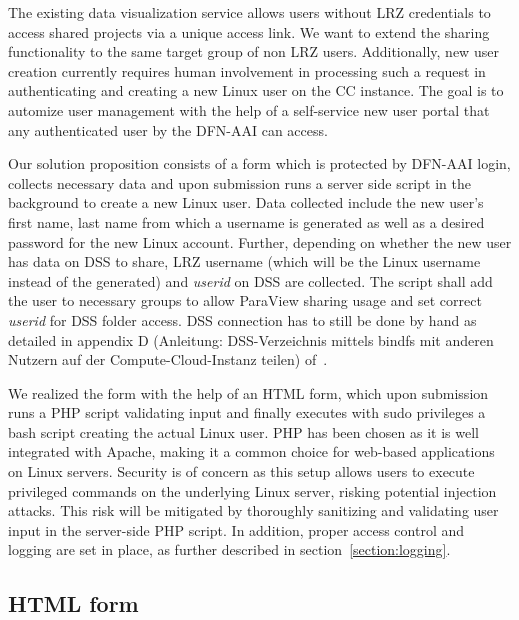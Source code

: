 The existing data visualization service allows users without LRZ credentials to
access shared projects via a unique access link. We want to extend the sharing
functionality to the same target group of non LRZ users. Additionally, new user
creation currently requires human involvement in processing such a request in
authenticating and creating a new Linux user on the CC instance. The goal is to
automize user management with the help of a self-service new user portal that
any authenticated user by the DFN-AAI can access. 

Our solution proposition consists of a form which is protected by DFN-AAI login,
collects necessary data and upon submission runs a server side script in the
background to create a new Linux user. Data collected include the new user's
first name, last name from which a username is generated as well as a desired
password for the new Linux account. Further, depending on whether the new user
has data on DSS to share, LRZ username (which will be the Linux username instead
of the generated) and \textit{userid} on DSS are collected. The script shall add
the user to necessary groups to allow ParaView sharing usage and set correct
\textit{userid} for DSS folder access. DSS connection has to still be done by
hand as detailed in appendix D (Anleitung: DSS-Verzeichnis mittels bindfs mit
anderen Nutzern auf der Compute-Cloud-Instanz teilen) of~\cite{nowak2024pvw}.

We realized the form with the help of an HTML form, which upon submission runs a
PHP script validating input and finally executes with sudo privileges a bash
script creating the actual Linux user. PHP has been chosen as it is well
integrated with Apache, making it a common choice for web-based applications on
Linux servers. Security is of concern as this setup allows users to execute
privileged commands on the underlying Linux server, risking potential injection
attacks. This risk will be mitigated by thoroughly sanitizing and validating
user input in the server-side PHP script. In addition, proper access control and
logging are set in place, as further described in section~\ref{section:logging}.

\subsection{HTML form}



